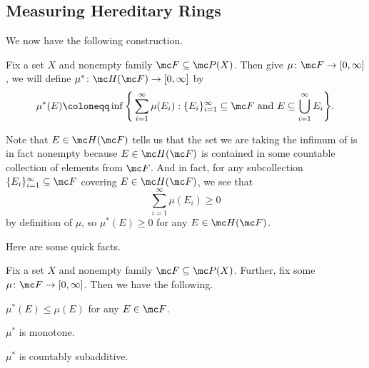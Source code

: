\documentclass[../notes.tex]{subfiles}
\begin{document}
\subsection{Measuring Hereditary Rings}
We now have the following construction.
\begin{notation}
	Fix a set $X$ and nonempty family $\mc F\subseteq\mc P(X)$. Then give $\mu\colon\mc F\to[0,\infty]$, we will define $\mu^*\colon\mc H(\mc F)\to[0,\infty]$ by
	\[\mu^*(E)\coloneqq\inf\Bigg\{\sum_{i=1}^\infty\mu(E_i):\{E_i\}_{i=1}^\infty\subseteq\mc F\text{ and }E\subseteq\bigcup_{i=1}^\infty E_i\Bigg\}.\]
\end{notation}
\begin{remark}
	Note that $E\in\mc H(\mc F)$ tells us that the set we are taking the infimum of is in fact nonempty because $E\in\mc H(\mc F)$ is contained in some countable collection of elements from $\mc F$. And in fact, for any subcollection $\{E_i\}_{i=1}^\infty\subseteq\mc F$ covering $E\in\mc H(\mc F)$, we see that
	\[\sum_{i=1}^\infty\mu(E_i)\ge0\]
	by definition of $\mu$, so $\mu^*(E)\ge0$ for any $E\in\mc H(\mc F)$.
\end{remark}
Here are some quick facts.
\begin{lemma} \label{lem:hered-measure-facts}
	Fix a set $X$ and nonempty family $\mc F\subseteq\mc P(X)$. Further, fix some $\mu\colon\mc F\to[0,\infty]$. Then we have the following.
	\begin{listalph}
		\item $\mu^*(E)\le\mu(E)$ for any $E\in\mc F$.
		\item $\mu^*$ is monotone.
		\item $\mu^*$ is countably subadditive.
	\end{listalph}
\end{lemma}
\end{document}
